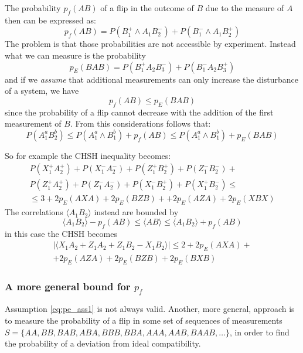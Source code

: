 \documentclass[a4paper]{article}
\newcommand{\abs}[1]{\lvert #1 \rvert}
\newcommand{\acron}[1]{\textsc{#1}}
\newcommand{\et}{\wedge}
\theoremstyle{definition}
\begin{document}
The probability $p_f(AB)$ of a flip in the outcome of $B$ due to the measure of $A$
then can be expressed as:
\begin{equation}
    p_f(AB) = P\left(B_1^+ \et A_1 B_2^-\right) + P\left(B_1^- \et A_1 B_2^+\right)
\end{equation}
The problem is that those probabilities are not accessible by experiment.
Instead what we can measure is the probability
\begin{equation}
    p_E (BAB) = P\left(B_1^+ A_2 B_3^-\right)+P\left(B_1^- A_2 B_3^+\right)
\end{equation}
and if we \emph{assume} that additional measurements can only increase the disturbance
of a system, we have 
\begin{equation}
    p_f(AB) \le p_E (BAB)   
    \label{eq:pe_ass1}
\end{equation}
since the probability of a flip cannot decrease with the addition of the first
measurement of $B$.
From this considerations follows that:
\begin{equation}
    P\left(A_1^a B_2^b\right) \le P(A_1^a \et B_1^b) + p_f(AB) \le P(A_1^a \et B_1^b) + p_E(BAB) 
    \label{eq:prob_noncomp}
\end{equation}

So for example the \acron{CHSH} inequality becomes:
\begin{multline}
    P(X_1^+ A_2^+) + P(X_1^- A_2^-) +
    P(Z_1^+ B_2^+) + P(Z_1^- B_2^-) +\\
    P(Z_1^+ A_2^+) + P(Z_1^- A_2^-) +
    P(X_1^- B_2^+) + P(X_1^+ B_2^-) \le \\
    \le 3 + 2 p_E(AXA) + 2p_E(BZB) +
    +2 p_E(AZA) + 2 p_E(XBX)
\end{multline}
The correlations $\langle{A_1B_2}\rangle$ instead are bounded by
\begin{equation}
    \langle{A_1B_2}\rangle - p_f(AB)\le \langle{AB}\rangle \le \langle{A_1B_2}\rangle + p_f(AB)
\end{equation}
in this case the \acron{CHSH} becomes
\begin{multline}
    \abs{\langle{X_1A_2 + Z_1A_2 + Z_1B_2 - X_1B_2}\rangle} \le 
    2 +  2p_E(AXA) +\\ 
    + 2p_E(AZA) + 2p_E(BZB) + 2p_E(BXB)
\end{multline}

\subsubsection{A more general bound for $p_f$}
Assumption \eqref{eq:pe_ass1} is not always valid.
Another, more general, approach is to measure the probability of a flip in
some set of sequences of measurements $S=\{AA, BB, BAB, ABA, BBB, BBA, AAA, AAB, BAAB,\ldots\}$, in
order to find the probability of a deviation from ideal compatibility.
\end{document}
